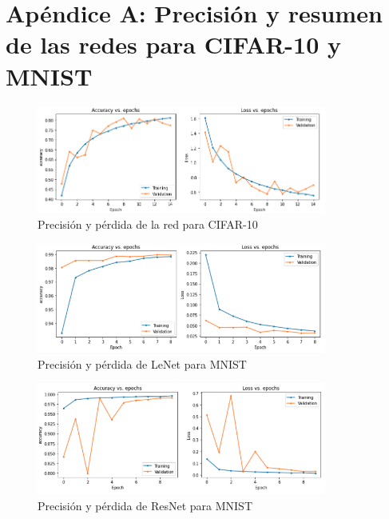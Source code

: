 \section{Apéndice A: Precisión y resumen de las redes para CIFAR-10 y MNIST}

\begin{figure}[h!]
    \centering
    \includegraphics[width=0.85\textwidth]{images/model_details/cifar_train.png}
    \caption{Precisión y pérdida de la red para CIFAR-10}
    \label{cifar prec}
\end{figure}

\begin{figure}[h!]
    \centering
    \includegraphics[width=0.85\textwidth]{images/model_details/mnist_linear_good_train.png}
    \caption{Precisión y pérdida de LeNet para MNIST}
    \label{lenet prec}
\end{figure}

\begin{figure}[h!]
    \centering
    \includegraphics[width=0.85\textwidth]{images/model_details/mnist_nonlinear_good_train.png}
    \caption{Precisión y pérdida de ResNet para MNIST}
    \label{resnet prec}
\end{figure}

